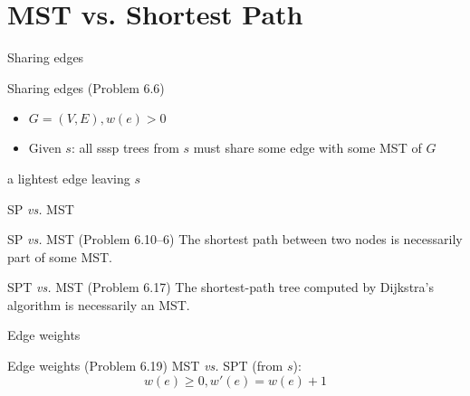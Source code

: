 \section{MST vs. Shortest Path}

\begin{frame}{Sharing edges}
  \begin{exampleblock}{Sharing edges (Problem 6.6)}
	\begin{itemize}
	  \item $G = (V, E), w(e) > 0$
	  \item Given $s$: all sssp trees from $s$ must share some edge with some MST of $G$
	\end{itemize}
  \end{exampleblock}

  \vspace{0.60cm}
  \centerline{a lightest edge leaving $s$}
\end{frame}
\begin{frame}{SP \emph{vs.} MST}
  \begin{exampleblock}{SP \emph{vs.} MST (Problem 6.10--6)}
	\xmark\; The shortest path between two nodes is necessarily part of some MST.
  \end{exampleblock}

  \vspace{0.50cm}
  \begin{exampleblock}{SPT \emph{vs.} MST (Problem 6.17)}
	\xmark\; The shortest-path tree computed by Dijkstra's algorithm is necessarily an MST.
  \end{exampleblock}

\end{frame}
\begin{frame}{Edge weights}
  \begin{exampleblock}{Edge weights (Problem 6.19)}
	MST \emph{vs.} SPT (from $s$):
	\[
	  w(e) \ge 0, w'(e) = w(e) + 1
	\]
  \end{exampleblock}
\end{frame}
